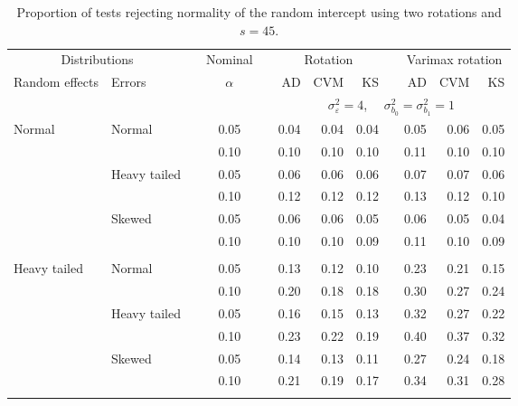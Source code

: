 \begin{table}[ht]
\centering
\caption{\label{tab:simb045} Proportion of tests rejecting normality of the random intercept using two rotations and $s = 45$.}
\begin{scriptsize}
\begin{tabular}{ll p{.1cm} c p{.1cm} rrr p{.1cm} rrr}
  \hline
  \multicolumn{2}{c}{Distributions}& & Nominal & &  \multicolumn{3}{c}{Rotation} & & \multicolumn{3}{c}{Varimax rotation} \\ \cline{1-2} \cline{6-8} \cline{10-12}   
  Random effects & Errors & & $\alpha$ & & AD & CVM & KS & & AD & CVM & KS \\ 
   \hline
& && && \multicolumn{7}{c}{$\sigma_{\varepsilon}^2 = 4$, \ \ $\sigma_{b_0}^2 = \sigma_{b_1}^2 = 1$} \\ \cline{6-12}
\rowcolor{gray!20}Normal       & Normal       && 0.05 &&   0.04 & 0.04 & 0.04 && 0.05 & 0.06 & 0.05 \\ 
\rowcolor{gray!20}             &              && 0.10 &&   0.10 & 0.10 & 0.10 && 0.11 & 0.10 & 0.10 \\ 
\rowcolor{gray!20}             & Heavy tailed && 0.05 &&   0.06 & 0.06 & 0.06 && 0.07 & 0.07 & 0.06 \\ 
\rowcolor{gray!20}             &              && 0.10 &&   0.12 & 0.12 & 0.12 && 0.13 & 0.12 & 0.10 \\ 
\rowcolor{gray!20}             & Skewed       && 0.05 &&   0.06 & 0.06 & 0.05 && 0.06 & 0.05 & 0.04 \\ 
\rowcolor{gray!20}             &              && 0.10 &&   0.10 & 0.10 & 0.09 && 0.11 & 0.10 & 0.09 \\ 
             &&&&&&&&&&&\\
Heavy tailed & Normal       && 0.05 &&   0.13 & 0.12 & 0.10 && 0.23 & 0.21 & 0.15 \\ 
             &              && 0.10 &&   0.20 & 0.18 & 0.18 && 0.30 & 0.27 & 0.24 \\ 
             & Heavy tailed && 0.05 &&   0.16 & 0.15 & 0.13 && 0.32 & 0.27 & 0.22 \\ 
             &              && 0.10 &&   0.23 & 0.22 & 0.19 && 0.40 & 0.37 & 0.32 \\ 
             & Skewed       && 0.05 &&   0.14 & 0.13 & 0.11 && 0.27 & 0.24 & 0.18 \\ 
             &              && 0.10 &&   0.21 & 0.19 & 0.17 && 0.34 & 0.31 & 0.28 \\ 
             &&&&&&&&&&&\\

\end{tabular}
\end{scriptsize}
\end{table}
